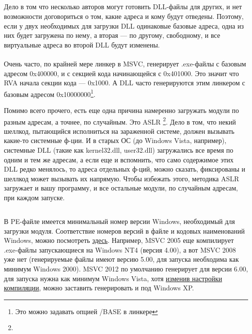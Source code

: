 \subsection{}
Дело в том что несколько авторов могут готовить DLL-файлы для других, и нет возможности договориться о том, какие адреса и кому будут отведены.
Поэтому, если у двух необходимых для загрузки DLL одинаковые базовые адреса, одна из них будет загружена по нему, а вторая --- по другому, свободному, и все виртуальные адреса во второй DLL будут изменены. \\
\\
Очень часто, по крайней мере линкер в \ac{MSVC}, генерирует .exe-файлы с базовым адресом 0x400000, и с секцией кода начинающейся с 0x401000. Это значит что \ac{RVA} начала секции кода --- 0x1000. 
А DLL часто генерируются этим линкером с базовым адресом 0x10000000\footnote{Это можно задавать опцией /BASE в линкере}.

Помимо всего прочего, есть еще одна причина намеренно загружать модули по разным адресам, а точнее, по случайным. 
Это \ac{ASLR}
\footnote{}.
Дело в том, что некий шеллкод, пытающийся исполниться на зараженной системе, должен вызывать какие-то системные ф-ции. И в старых ОС (до Windows Vista, например), системные DLL (такие как kernel32.dll, user32.dll) загружались все время
по одним и тем же адресам, а если еще и вспомнить, что само содержимое этих DLL редко менялось, то адреса отдельных
ф-ций, можно сказать, фиксированы и шеллкод может вызывать их напрямую. Чтобы избежать этого, методика \ac{ASLR} загружает
и вашу программу, и все остальные модули, по случайным адресам, при каждом запуске.

\subsection{}

В PE-файле имеется минимальный номер версии Windows, необходимый для загрузки модуля. 
Соответствие номеров версий в файле и кодовых наименований Windows, можно посмотреть 
\href{https://en.wikipedia.org/wiki/Windows_NT#Releases}{здесь}.
Например, \ac{MSVC} 2005 еще компилирует .exe-файлы запускающиеся на Windows NT4 (версия 4.00),
а вот \ac{MSVC} 2008 уже нет (генерируемые файлы имеют версию 5.00, для запуска необходима как минимум Windows 2000).
\ac{MSVC} 2012 по умолчанию генерирует для версии 6.00, для запуска нужна как минимум Windows Vista, хотя 
\href{http://blogs.msdn.com/b/vcblog/archive/2012/10/08/10357555.aspx}{изменив настройки компиляции}, 
можно заставить генерировать и под Windows XP.

